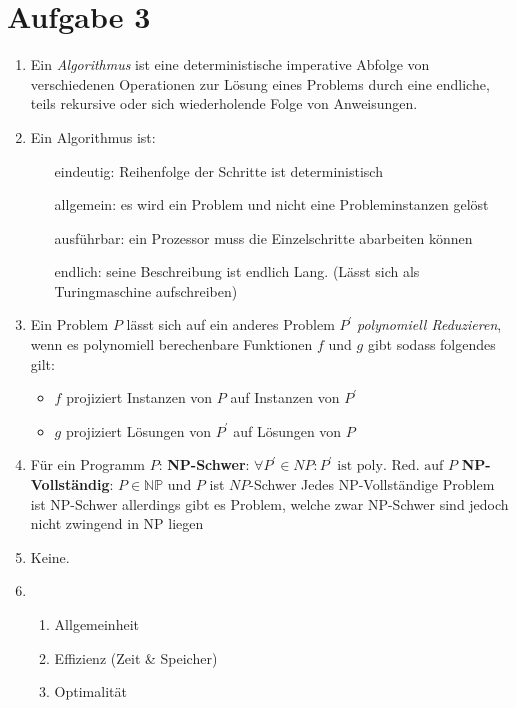\documentclass[12pt]{article}
\begin{document}
	\section{Aufgabe 3}
	\begin{enumerate}[label=(\alph*)]
		\item Ein \textit{Algorithmus} ist eine deterministische imperative Abfolge von verschiedenen Operationen zur Lösung eines Problems durch eine endliche, teils rekursive oder sich wiederholende Folge von Anweisungen.
		\item Ein Algorithmus ist: \begin{itemize}
				\setlength{\itemindent}{2in}
				\item[eindeutig:] Reihenfolge der Schritte ist deterministisch
				\item[allgemein:] es wird ein Problem und nicht eine Probleminstanzen gelöst
				\item[ausführbar:] ein Prozessor muss die Einzelschritte abarbeiten können
				\item[endlich:] seine Beschreibung ist endlich Lang. (Lässt sich als Turingmaschine aufschreiben)			
			\end{itemize}
		\item Ein Problem $P$ lässt sich auf ein anderes Problem $P^\prime$ \textit{polynomiell Reduzieren}, wenn es polynomiell berechenbare Funktionen $f$ und $g$ gibt sodass folgendes gilt:
			\begin{itemize}
				\item $f$ projiziert Instanzen von $P$ auf Instanzen von $P^\prime$
				\item $g$ projiziert Lösungen von $P^\prime$ auf Lösungen von $P$
			\end{itemize}
		\item 
		Für ein Programm $P$:
		\textbf{NP-Schwer}: $\forall P^\prime\in NP: P^\prime\text{ ist poly. Red. auf }P$ \newline
		\textbf{NP-Vollständig}: $P\in \mathbb{NP}$ und $P$ ist $NP$-Schwer \newline
		Jedes NP-Vollständige Problem ist NP-Schwer allerdings gibt es Problem, welche zwar NP-Schwer sind jedoch nicht zwingend in NP liegen
		\item Keine.
		\item \begin{enumerate}
			\item Allgemeinheit
			\item Effizienz (Zeit \& Speicher)
			\item Optimalität
		\end{enumerate}
	\end{enumerate}
\end{document}
